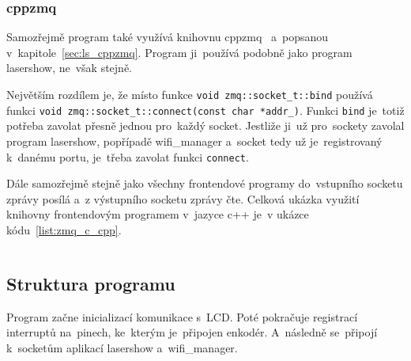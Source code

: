 \subsubsection{cppzmq}
Samozřejmě program také využívá knihovnu cppzmq~\cite{cppzmq} a~popsanou v~kapitole~\ref{sec:ls_cppzmq}. Program ji~používá podobně jako program lasershow, ne~však stejně.

Největším rozdílem je, že místo funkce \texttt{void zmq::socket_t::bind} používá funkci \texttt{void zmq::socket_t::connect(const char *addr_)}.
Funkci \texttt{bind} je~totiž potřeba zavolat přesně jednou pro~každý socket.
Jestliže ji~už pro~sockety zavolal program lasershow, popřípadě wifi\_manager a~socket tedy už je~registrovaný k~danému portu, je~třeba zavolat funkci \texttt{connect}.

Dále samozřejmě stejně jako všechny frontendové programy do~vstupního socketu zprávy posílá a~z výstupního socketu zprávy čte. Celková ukázka využití knihovny frontendovým programem v~jazyce c++ je~v ukázce kódu~\ref{list:zmq_c_cpp}.

\begin{code}
    \inputminted[frame=lines,fontsize=\footnotesize{}, linenos, breaklines]{cpp}{code_examples/zmq_client.cpp}
\end{code}

\subsection{Struktura programu}
Program začne inicializací komunikace s~LCD.
Poté pokračuje registrací interruptů na~pinech, ke~kterým je~připojen enkodér. A~následně se~připojí k~socketům aplikací lasershow a~wifi\_manager.


